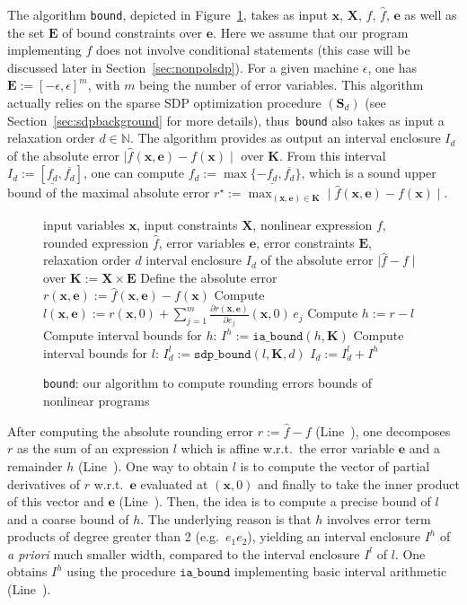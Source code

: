 \documentclass[preprint]{sigplanconf}
\newcommand{\code}[1]{\lstinline{#1}}
\newcommand{\N}{\mathbb{N}}
\newcommand{\x}{\mathbf{x}}
\newcommand{\e}{\mathbf{e}}
\def\S{\mathbf{S}}
\def\E{\mathbf{E}}
\def\K{\mathbf{K}}
\def\S{\mathbf{S}}
\def\X{\mathbf{X}}
\newcommand{\iaboundfun}[2]{\mathtt{ia\_bound}(#1, #2)}
\newcommand{\iabound}{\mathtt{ia\_bound}}
\newcommand{\sdpboundfun}[3]{\mathtt{sdp\_bound}(#1, #2, #3)}
\theoremstyle{plain}
\begin{document}
The algorithm \code{bound}, depicted in Figure~\ref{alg:bound}, takes as input $\x$, $\X$, $f$, $\hat{f}$, $\e$ as well as the set $\E$ of bound constraints over $\e$. Here we assume that our program implementing $f$ does not involve conditional statements (this case will be discussed later in Section~\ref{sec:nonpolsdp}). For a given machine $\epsilon$, one has $\E := [-\epsilon, \epsilon]^m$, with $m$ being the number of error variables. This algorithm actually relies on the sparse SDP optimization procedure $(\S_d)$ (see Section~\ref{sec:sdpbackground} for more details), thus~\code{bound} also takes as input a relaxation order $d \in \N$. The algorithm provides as output an interval enclosure $I_d$ of the absolute error $\mid \hat{f}(\x,\e) - f(\x) \mid$ over $\K$. 
From this interval $I_d:= [\underline{f_d}, \overline{f_d}]$, one can compute $f_d := \max \{- \underline{f_d}, \overline{f_d} \}$, which is a sound upper bound of the maximal absolute error $r^\star := \max_{(\x,\e)\in \K} \mid \hat{f}(\x,\e) - f(\x) \mid $.

\begin{figure}[!ht]
\begin{algorithmic}[1]                    
\Require input variables $\x$, input constraints $\X$, nonlinear expression $f$, rounded expression $\hat{f}$, error variables $\e$, error constraints $\E$, relaxation order $d$
\Ensure interval enclosure $I_d$ of the absolute error $\mid \hat{f} - f  \mid$ over $\K := \X \times \E$
\State Define the absolute error $r(\x, \e) := \hat{f}(\x,\e) - f(\x)$ \label{line:r}
\State Compute $l(\x,\e) := r(\x, 0) + \sum_{j=1}^m \frac{\partial r(\x,\e)} {\partial e_j} (\x,0) \, e_j$ \label{line:l}
\State Compute $h := r - l$ \label{line:h}
\State Compute interval bounds for $h$: $I^h := \iaboundfun{h}{\K}$ \label{line:iabound}
\State Compute interval bounds for $l$: $I_d^l := \sdpboundfun{l}{\K}{d}$  \label{line:sdpbound}
\State \Return $I_d := I_d^l + I^h$ 
\end{algorithmic}
\caption{\code{bound}: our algorithm to compute rounding errors bounds of nonlinear programs}
\label{alg:bound}
\end{figure}

After computing the absolute rounding error $r := \hat{f} - f$ (Line~), one decomposes $r$ as the sum of an expression $l$ which is affine w.r.t.~the error variable $\e$ and a remainder $h$ (Line~). One way to obtain $l$ is to compute the vector of partial derivatives of $r$ w.r.t.~$\e$ evaluated at $(\x, 0)$ and finally to take the inner product of this vector and $\e$ (Line~). Then, the idea is to compute a precise bound of $l$ and a coarse bound of $h$. The underlying reason is that $h$ involves error term products of degree greater than 2 (e.g.~$e_1 e_2$), yielding an interval enclosure $I^h$ of \textit{a priori} much smaller width, compared to the interval enclosure $I^l$ of $l$. One obtains $I^h$ using the procedure $\iabound$ implementing basic interval arithmetic (Line~). 
%
\end{document}
